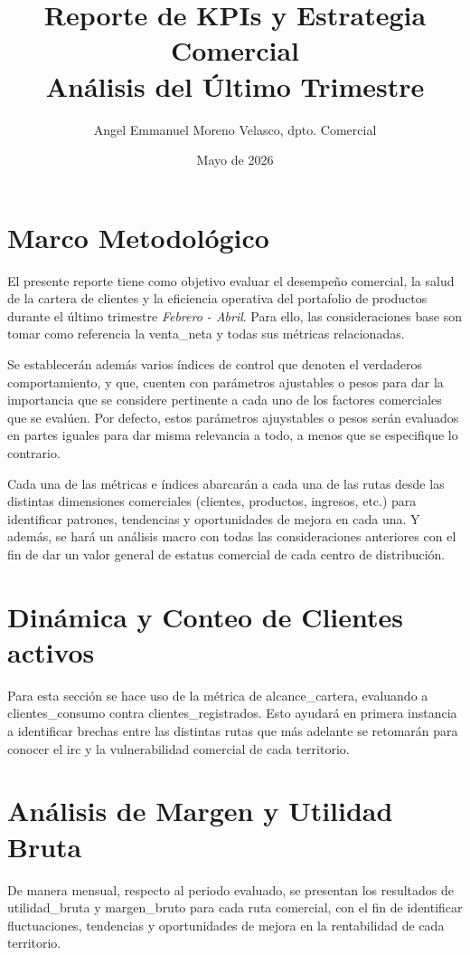\documentclass[12pt, letterpaper]{article}
\title{Reporte de KPIs y Estrategia Comercial \\ \large Análisis del Último Trimestre}
\author{Angel Emmanuel Moreno Velasco, dpto. Comercial}
\date{Mayo de 2026}
\begin{document}
\maketitle
\newpage


\section{Marco Metodológico}
El presente reporte tiene como objetivo evaluar el desempeño comercial, la salud de la cartera de clientes
y la eficiencia operativa del portafolio de productos durante el último trimestre \textit{Febrero - Abril}.
Para ello, las consideraciones base son tomar como referencia la \gls{venta_neta} y todas sus métricas relacionadas.

Se establecerán además varios índices de control que denoten el verdaderos comportamiento, y que, cuenten con parámetros
ajustables o pesos para dar la importancia que se considere pertinente a cada uno de los factores comerciales que se evalúen.
Por defecto, estos parámetros ajuystables o pesos serán evaluados en partes iguales para dar misma relevancia a todo,
a menos que se especifique lo contrario.

Cada una de las métricas e índices abarcarán a cada una de las rutas desde las distintas dimensiones comerciales (clientes, productos, ingresos, etc.)
para identificar patrones, tendencias y oportunidades de mejora en cada una. Y además, se hará un análisis macro con todas las consideraciones anteriores
con el fin de dar un valor general de estatus comercial de cada centro de distribución.

\section{Dinámica y Conteo de Clientes activos}

Para esta sección se hace uso de la métrica de \gls{alcance_cartera}, evaluando a \gls{clientes_consumo} contra \gls{clientes_registrados}.
Esto ayudará en primera instancia a identificar brechas entre las distintas rutas que más adelante se retomarán para conocer el \gls{irc} y
la vulnerabilidad comercial de cada territorio.



\section{Análisis de Margen y Utilidad Bruta}

De manera mensual, respecto al periodo evaluado, se presentan los resultados de \gls{utilidad_bruta} y \gls{margen_bruto} para cada ruta comercial, con el fin de
identificar fluctuaciones, tendencias y oportunidades de mejora en la rentabilidad de cada territorio.
\end{document}
